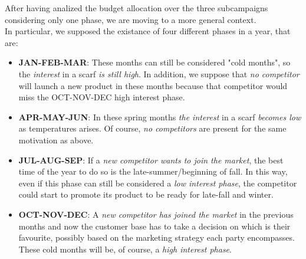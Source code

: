 After having analized the budget allocation over the three subcampaigns considering only one phase, we are moving to a more general context.
\\In particular, we supposed the existance of four different phases in a year, that are:
\begin{itemize}
	\item \textbf{JAN-FEB-MAR}: These months can still be considered "cold months", so the \emph{interest} in a scarf \emph{is still high}. In addition, we suppose that \emph{no competitor} will launch a new product in these months because that competitor would miss the OCT-NOV-DEC high interest phase.
	\item \textbf{APR-MAY-JUN}: In these spring months \emph{the interest} in a scarf \emph{becomes low} as temperatures arises. Of course, \emph{no competitors} are present for the same motivation as above.
	\item \textbf{JUL-AUG-SEP}: If a \emph{new competitor wants to join the market}, the best time of the year to do so is the late-summer/beginning of fall. In this way, even if this phase can still be considered a \emph{low interest phase}, the competitor could start to promote its product to be ready for late-fall and winter.
	\item \textbf{OCT-NOV-DEC}: A \emph{new competitor has joined the market} in the previous months and now the customer base has to take a decision on which is their favourite, possibly based on the marketing strategy each party encompasses. These cold months will be, of course, a \emph{high interest phase}.
\end{itemize}